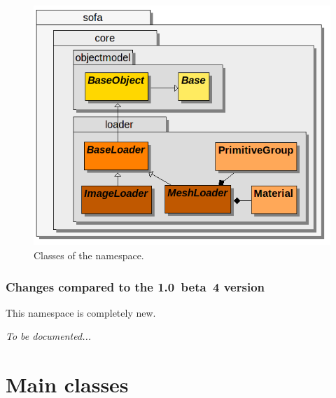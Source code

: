 \begin{figure}[h]
\centering
\includegraphics[scale=.33]{../classdiagrams/sofacore-loader.png}
\caption{Classes of the  namespace.}
\label{fig:uml-sofa-core-loader}
\end{figure}

\subsubsection{Changes compared to the 1.0~beta~4 version}

This namespace is completely new.

\textit{To be documented...}

\pagebreak

\section{Main classes}

\subsection{}

\subsubsection{}



